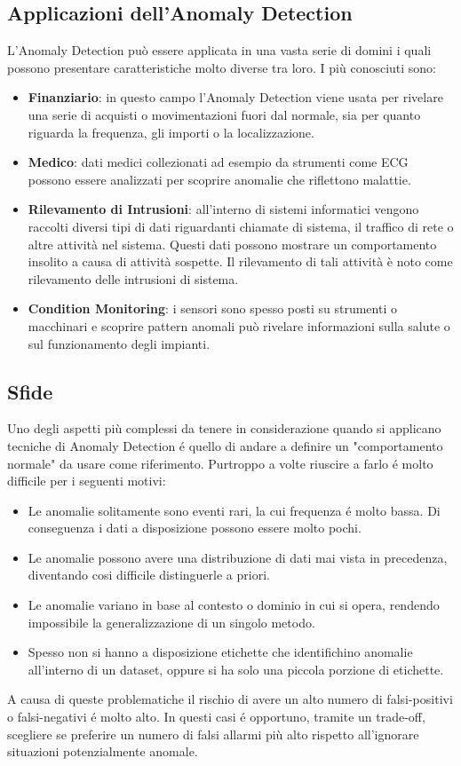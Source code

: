 \subsection{Applicazioni dell'Anomaly Detection}
L'Anomaly Detection può essere applicata in una vasta serie di domini i quali possono presentare caratteristiche molto diverse tra loro. I più conosciuti sono:
\begin{itemize}
	\item \textbf{Finanziario}: in questo campo l'Anomaly Detection viene usata per rivelare una serie di acquisti o movimentazioni fuori dal normale, sia per quanto riguarda la frequenza, gli importi o la localizzazione.
	\item \textbf{Medico}: dati medici collezionati ad esempio da strumenti come ECG possono essere analizzati per scoprire anomalie che riflettono malattie.
	\item \textbf{Rilevamento di Intrusioni}: all'interno di sistemi informatici vengono raccolti diversi tipi di dati riguardanti chiamate di sistema, il traffico di rete o altre attività nel sistema. Questi dati possono mostrare un comportamento insolito a causa di attività sospette. Il rilevamento di tali attività è noto come rilevamento delle intrusioni di sistema.
	\item \textbf{Condition Monitoring}: i sensori sono spesso posti su strumenti o macchinari e scoprire pattern anomali può rivelare informazioni sulla salute o sul funzionamento degli impianti.
\end{itemize}

\subsection{Sfide}
Uno degli aspetti più complessi da tenere in considerazione quando si applicano tecniche di Anomaly Detection é quello di andare a definire un "comportamento normale" da usare come riferimento. Purtroppo a volte riuscire a farlo é molto difficile per i seguenti motivi:
\begin{itemize}
	\item Le anomalie solitamente sono eventi rari, la cui frequenza é molto bassa. Di conseguenza i dati a disposizione possono essere molto pochi.
	\item Le anomalie possono avere una distribuzione di dati mai vista in precedenza, diventando cosi difficile distinguerle a priori.
	\item Le anomalie variano in base al contesto o dominio in cui si opera, rendendo impossibile la generalizzazione di un singolo metodo.
	\item Spesso non si hanno a disposizione etichette che identifichino anomalie all'interno di un dataset, oppure si ha solo una piccola porzione di etichette.
\end{itemize}
A causa di queste problematiche il rischio di avere un alto numero di falsi-positivi o falsi-negativi é molto alto. In questi casi é opportuno, tramite un trade-off, scegliere se preferire un numero di falsi allarmi più alto rispetto all'ignorare situazioni potenzialmente anomale.

